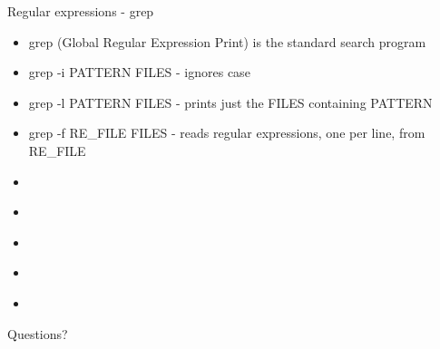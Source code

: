 \documentclass[t]{beamer}
\begin{document}
\begin{frame}{Regular expressions - grep}
  \begin{itemize}
  \item grep (Global Regular Expression Print) is the standard search
    program
  \item grep -i PATTERN FILES - ignores case
  \item grep -l PATTERN FILES - prints just the FILES containing
    PATTERN
  \item grep -f RE\_FILE FILES - reads regular expressions, one per
    line, from RE\_FILE
  \end{itemize}
  \note{}
\end{frame}

\begin{frame}{}
  \begin{itemize}
  \item 
  \end{itemize}
  \note{}
\end{frame}

\begin{frame}{}
  \begin{itemize}
  \item 
  \end{itemize}
  \note{}
\end{frame}

\begin{frame}{}
  \begin{itemize}
  \item 
  \end{itemize}
  \note{}
\end{frame}

\begin{frame}{}
  \begin{itemize}
  \item 
  \end{itemize}
  \note{}
\end{frame}

\begin{frame}{}
  \begin{itemize}
  \item 
  \end{itemize}
  \note{}
\end{frame}

\begin{frame}{Questions?}
  \note{}
\end{frame}
\end{document}
